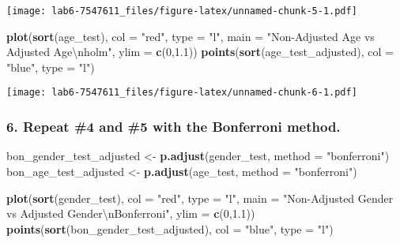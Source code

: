 \documentclass[]{article}
\newenvironment{Shaded}{\begin{snugshade}}{\end{snugshade}}
\newcommand{\KeywordTok}[1]{\textcolor[rgb]{0.13,0.29,0.53}{\textbf{{#1}}}}
\newcommand{\DataTypeTok}[1]{\textcolor[rgb]{0.13,0.29,0.53}{{#1}}}
\newcommand{\DecValTok}[1]{\textcolor[rgb]{0.00,0.00,0.81}{{#1}}}
\newcommand{\FloatTok}[1]{\textcolor[rgb]{0.00,0.00,0.81}{{#1}}}
\newcommand{\CharTok}[1]{\textcolor[rgb]{0.31,0.60,0.02}{{#1}}}
\newcommand{\StringTok}[1]{\textcolor[rgb]{0.31,0.60,0.02}{{#1}}}
\newcommand{\NormalTok}[1]{{#1}}
\begin{document}
\texttt{[image: lab6-7547611\_files/figure-latex/unnamed-chunk-5-1.pdf]}
\newpage

\begin{Shaded}
\begin{Highlighting}[]
\KeywordTok{plot}\NormalTok{(}\KeywordTok{sort}\NormalTok{(age_test), }\DataTypeTok{col =} \StringTok{"red"}\NormalTok{, }\DataTypeTok{type =} \StringTok{"l"}\NormalTok{, }
     \DataTypeTok{main =} \StringTok{"Non-Adjusted Age vs Adjusted Age}\CharTok{\textbackslash{}n}\StringTok{holm"}\NormalTok{, }\DataTypeTok{ylim =} \KeywordTok{c}\NormalTok{(}\DecValTok{0}\NormalTok{,}\FloatTok{1.1}\NormalTok{))}
\KeywordTok{points}\NormalTok{(}\KeywordTok{sort}\NormalTok{(age_test_adjusted), }\DataTypeTok{col =} \StringTok{"blue"}\NormalTok{, }\DataTypeTok{type =} \StringTok{"l"}\NormalTok{)}
\end{Highlighting}
\end{Shaded}

\texttt{[image: lab6-7547611\_files/figure-latex/unnamed-chunk-6-1.pdf]}
\newpage

\subsubsection{6. Repeat \#4 and \#5 with the Bonferroni
method.}\label{repeat-4-and-5-with-the-bonferroni-method.}

\begin{Shaded}
\begin{Highlighting}[]
\NormalTok{bon_gender_test_adjusted <-}\StringTok{ }\KeywordTok{p.adjust}\NormalTok{(gender_test, }\DataTypeTok{method =} \StringTok{"bonferroni"}\NormalTok{)}
\NormalTok{bon_age_test_adjusted <-}\StringTok{ }\KeywordTok{p.adjust}\NormalTok{(age_test, }\DataTypeTok{method =} \StringTok{"bonferroni"}\NormalTok{)}

\KeywordTok{plot}\NormalTok{(}\KeywordTok{sort}\NormalTok{(gender_test), }\DataTypeTok{col =} \StringTok{"red"}\NormalTok{, }\DataTypeTok{type =} \StringTok{"l"}\NormalTok{, }
     \DataTypeTok{main =} \StringTok{"Non-Adjusted Gender vs Adjusted Gender}\CharTok{\textbackslash{}n}\StringTok{Bonferroni"}\NormalTok{, }\DataTypeTok{ylim =} \KeywordTok{c}\NormalTok{(}\DecValTok{0}\NormalTok{,}\FloatTok{1.1}\NormalTok{))}
\KeywordTok{points}\NormalTok{(}\KeywordTok{sort}\NormalTok{(bon_gender_test_adjusted), }\DataTypeTok{col =} \StringTok{"blue"}\NormalTok{, }\DataTypeTok{type =} \StringTok{"l"}\NormalTok{)}
\end{Highlighting}
\end{Shaded}
\end{document}
